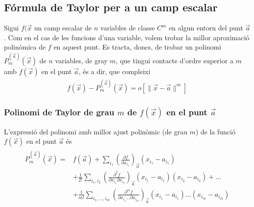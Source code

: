\subsection{Fórmula de Taylor per a un camp escalar}
Sigui $f(\vec{x}$ un camp escalar de $n$ variables de classe $C^{m}$ en algun entorn del punt $\vec{a}$. Com en el cas de les funcions d'una variable, volem trobar la millor aproximació polinòmica de $f$ en aquest punt. Es tracta, doncs, de trobar un polinomi $P_{m}^{(\vec{a})} (\vec{x})$ de $n$ variables, de gray $m$, que tingui contacte d'ordre superior a $m$ amb $f(\vec{x})$ en el punt $\vec{a}$, és a dir, que compleixi
\begin{align}
    f(\vec{x}) - P_{m}^{(\vec{a})}(\vec{x}) = o [\| \vec{x} - \vec{a} \|^{m}]
\end{align}

\subsubsection*{Polinomi de Taylor de grau $m$ de $f(\vec{x})$ en el punt $\vec{a}$}
L'expressió del polinomi amb millor ajust polinòmic (de grau $m$) de la funció $f(\vec{x})$ en el punt $\vec{a}$ és
\begin{align}
    \begin{aligned}
        P_{m}^{(\vec{a})}(\vec{x}) = & f(\vec{a}) + \sum_{i_{1}} \left( \frac{\partial f}{\partial x_{i_{1}}} \right)_{\vec{a}} (x_{i_{1}} - a_{i_{1}}) \\
        & + \frac{1}{2!} \sum_{i_{1}, i_{2}} \left( \frac{\partial^{2} f}{\partial x_{i_{1}} \partial x_{i_{2}}} \right)_{\vec{a}} (x_{i_{1}} - a_{i_{1}}) (x_{i_{2}} - a_{i_{2}}) + \dots \\
        & + \frac{1}{m!} \sum_{i_{1}, \dots, i_{m}} \left( \frac{\partial^{m} f}{\partial x_{i_{1}} \dots \partial x_{i_{m}}} \right)_{\vec{a}} (x_{i_{1}} - a_{i_{1}}) \dots (x_{i_{m}} - a_{i_{m}})
    \end{aligned}
\end{align}

